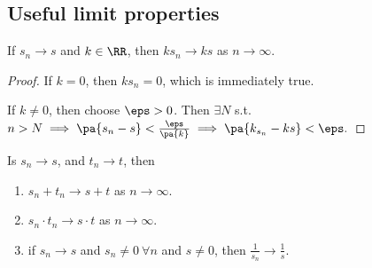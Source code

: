 \documentclass[11pt]{scrartcl}
\numberwithin{equation}{section}
\begin{document}
\subsection{Useful limit properties}
\begin{proposition}
    If $s_n\rightarrow s$  and $k \in \RR$,  then $ks_n \rightarrow ks$
    as $n\rightarrow\infty$.
\end{proposition}
\begin{proof}
    If $k=0$, then $ks_n = 0$, which is immediately true.
    
    If $k\neq 0$, then choose $\eps >0$. Then $\exists N$ s.t. 
    $n>N \implies \pa{s_n-s}<\frac{\eps}{\pa{k}} \implies 
    \pa{k_{s_n}-ks} < \eps.$
\end{proof}
\begin{proposition}
    Is $s_n\rightarrow s$, and $t_n\rightarrow t$, then
    \begin{enumerate}
        \item $s_n+t_n \rightarrow s+t$ as $n\rightarrow \infty.$
        \item $s_n\cdot t_n \rightarrow s\cdot t$ as $n\rightarrow \infty.$
        \item if $s_n\rightarrow s$ and $s_n\neq 0 \ \forall n$ and $s\neq0$,
        then $\frac{1}{s_n}\rightarrow \frac{1}{s}$.
    \end{enumerate} 
\end{proposition}
\end{document}
